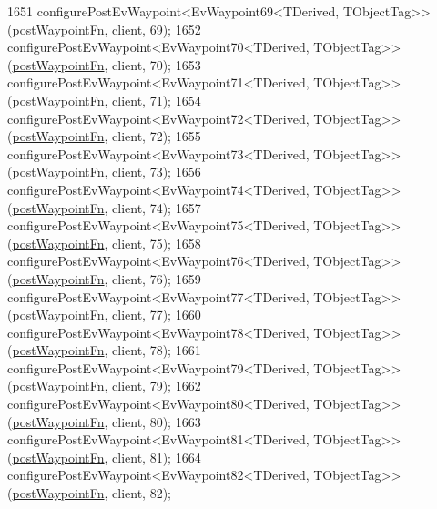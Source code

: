 \begin{DoxyCode}
1651     configurePostEvWaypoint<EvWaypoint69<TDerived, TObjectTag>>(\hyperlink{classmove__base__z__client_1_1WaypointEventDispatcher_acc538eb7506c13f7cca2268a1742dadd}{postWaypointFn}, client, 69);
1652     configurePostEvWaypoint<EvWaypoint70<TDerived, TObjectTag>>(\hyperlink{classmove__base__z__client_1_1WaypointEventDispatcher_acc538eb7506c13f7cca2268a1742dadd}{postWaypointFn}, client, 70);
1653     configurePostEvWaypoint<EvWaypoint71<TDerived, TObjectTag>>(\hyperlink{classmove__base__z__client_1_1WaypointEventDispatcher_acc538eb7506c13f7cca2268a1742dadd}{postWaypointFn}, client, 71);
1654     configurePostEvWaypoint<EvWaypoint72<TDerived, TObjectTag>>(\hyperlink{classmove__base__z__client_1_1WaypointEventDispatcher_acc538eb7506c13f7cca2268a1742dadd}{postWaypointFn}, client, 72);
1655     configurePostEvWaypoint<EvWaypoint73<TDerived, TObjectTag>>(\hyperlink{classmove__base__z__client_1_1WaypointEventDispatcher_acc538eb7506c13f7cca2268a1742dadd}{postWaypointFn}, client, 73);
1656     configurePostEvWaypoint<EvWaypoint74<TDerived, TObjectTag>>(\hyperlink{classmove__base__z__client_1_1WaypointEventDispatcher_acc538eb7506c13f7cca2268a1742dadd}{postWaypointFn}, client, 74);
1657     configurePostEvWaypoint<EvWaypoint75<TDerived, TObjectTag>>(\hyperlink{classmove__base__z__client_1_1WaypointEventDispatcher_acc538eb7506c13f7cca2268a1742dadd}{postWaypointFn}, client, 75);
1658     configurePostEvWaypoint<EvWaypoint76<TDerived, TObjectTag>>(\hyperlink{classmove__base__z__client_1_1WaypointEventDispatcher_acc538eb7506c13f7cca2268a1742dadd}{postWaypointFn}, client, 76);
1659     configurePostEvWaypoint<EvWaypoint77<TDerived, TObjectTag>>(\hyperlink{classmove__base__z__client_1_1WaypointEventDispatcher_acc538eb7506c13f7cca2268a1742dadd}{postWaypointFn}, client, 77);
1660     configurePostEvWaypoint<EvWaypoint78<TDerived, TObjectTag>>(\hyperlink{classmove__base__z__client_1_1WaypointEventDispatcher_acc538eb7506c13f7cca2268a1742dadd}{postWaypointFn}, client, 78);
1661     configurePostEvWaypoint<EvWaypoint79<TDerived, TObjectTag>>(\hyperlink{classmove__base__z__client_1_1WaypointEventDispatcher_acc538eb7506c13f7cca2268a1742dadd}{postWaypointFn}, client, 79);
1662     configurePostEvWaypoint<EvWaypoint80<TDerived, TObjectTag>>(\hyperlink{classmove__base__z__client_1_1WaypointEventDispatcher_acc538eb7506c13f7cca2268a1742dadd}{postWaypointFn}, client, 80);
1663     configurePostEvWaypoint<EvWaypoint81<TDerived, TObjectTag>>(\hyperlink{classmove__base__z__client_1_1WaypointEventDispatcher_acc538eb7506c13f7cca2268a1742dadd}{postWaypointFn}, client, 81);
1664     configurePostEvWaypoint<EvWaypoint82<TDerived, TObjectTag>>(\hyperlink{classmove__base__z__client_1_1WaypointEventDispatcher_acc538eb7506c13f7cca2268a1742dadd}{postWaypointFn}, client, 82);

\end{DoxyCode}
